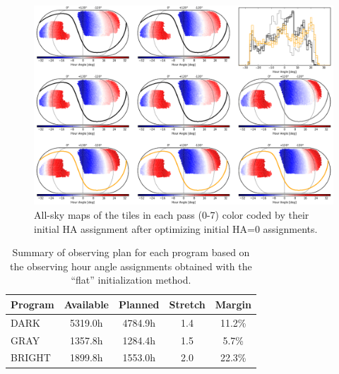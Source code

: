 \documentclass[12pt]{article}
\begin{document}
\begin{figure}[htb]
\begin{center}
\includegraphics[width=6in]{HA_flat}
\caption{All-sky maps of the tiles in each pass (0-7) color coded by their initial HA assignment after optimizing initial HA=0 assignments.}
\label{fig:HA_flat}
\end{center}
\end{figure}

\begin{table}[htb]
\begin{center}
\begin{tabular}{lcccc}
Program & Available & Planned & Stretch & Margin \\
\hline
DARK   & 5319.0h & 4784.9h & 1.4 & 11.2\% \\
GRAY   & 1357.8h & 1284.4h & 1.5 &  5.7\% \\
BRIGHT & 1899.8h & 1553.0h & 2.0 & 22.3\% \\
\hline
\end{tabular}
\caption{Summary of observing plan for each program based on the observing hour angle assignments obtained with the ``flat'' initialization method.}
\label{tab:summary}
\end{center}
\end{table}

\def\apjl{ApJL} %
\def\aj{AJ} %
\def\apj{ApJ} %
\def\pasp{PASP} %
\def\spie{SPIE} %
\def\apjs{ApJS} %
\def\araa{ARAA} %
\def\aap{A\&A} %
\def\aaps{A\&A~Supl.} %
\def\nat{Nature} %
\def\nar{New Astron. Rev.} %
\def\mnras{MNRAS} %
\def\jcap{JCAP} %
\def\prd{{Phys.~Rev.~D}}        %
\def\physrep{{Phys.~Reports}} %



\end{document}
